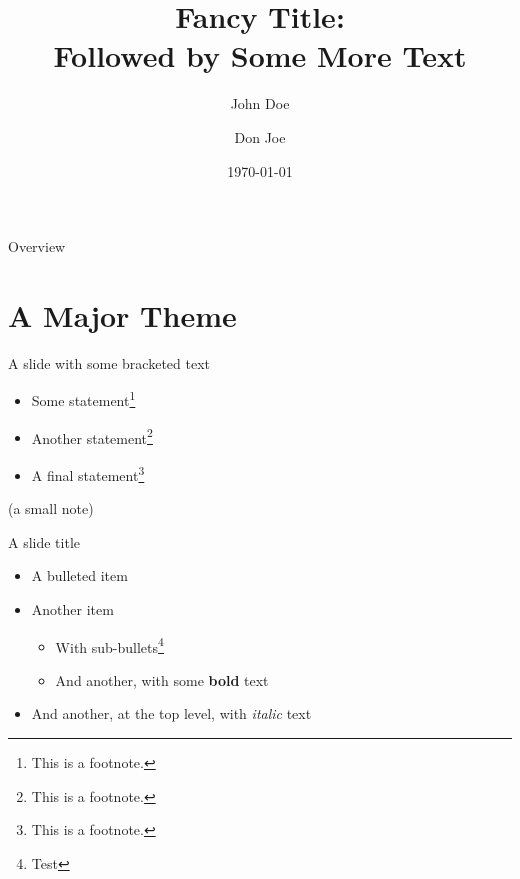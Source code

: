 \documentclass[11pt,aspectratio=169]{beamer}
\title{Fancy Title: \\ Followed by Some More Text}
\author{\name \inst{1} \and John Doe \inst{2} \and Don Joe \inst{2}}
\institute[shortinst]{\inst{1} \department \\ 
                      \inst{2} Another University, Another Department
}
\date{\today}
\begin{document}
{
  \begin{frame}
    \titlepage
  \end{frame}
}

\begin{frame}{Overview}
    \tableofcontents
\end{frame}

\section{A Major Theme}
\begin{frame}{A slide with some bracketed text}

	\begin{itemize}
		\item Some statement\footnote{This is a footnote.} 
		\item Another statement\footnote{This is a footnote.}
    \item A final statement\footnote{This is a footnote.}
	\end{itemize}

	\vspace{3ex}
	\begin{center}
		\scriptsize (a small note)
	\end{center}

\end{frame}

\begin{frame}{A slide title}

  \begin{itemize}
    \item A bulleted item
    \item Another item
      \begin{itemize}
        \item With sub-bullets\footnote{Test}
        \item And another, with some \textbf{bold} text
      \end{itemize}
    \item And another, at the top level, with \textit{italic} text
  \end{itemize}

\end{frame}
\end{document}
